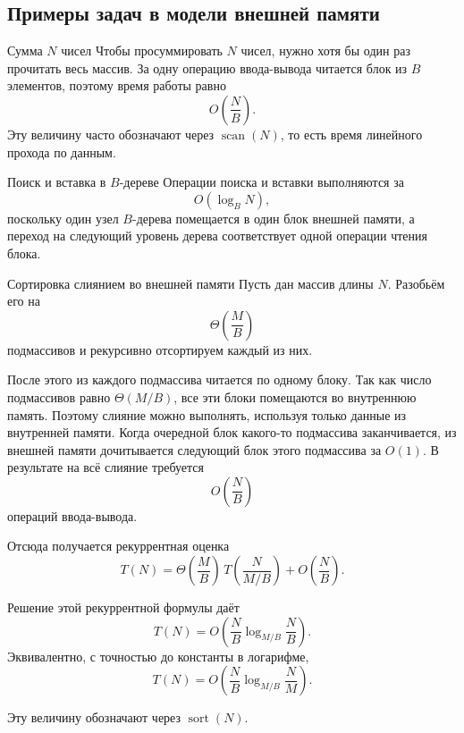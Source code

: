 \subsection{Примеры задач в модели внешней памяти}

\begin{Example}{Сумма \(N\) чисел}{}
	Чтобы просуммировать \(N\) чисел, нужно хотя бы один раз прочитать весь массив. За одну операцию ввода-вывода читается блок из \(B\) элементов, поэтому время работы равно
	\[
	O\!\left(\frac{N}{B}\right).
	\]
	Эту величину часто обозначают через \(\operatorname{scan}(N)\), то есть время линейного прохода по данным.
\end{Example}

\begin{Example}{Поиск и вставка в \(B\)-дереве}{}
	Операции поиска и вставки выполняются за
	\[
	O(\log_B N),
	\]
	поскольку один узел \(B\)-дерева помещается в один блок внешней памяти, а переход на следующий уровень дерева соответствует одной операции чтения блока.
\end{Example}

\begin{Example}{Сортировка слиянием во внешней памяти}{}
	Пусть дан массив длины \(N\). Разобьём его на
	\[
	\Theta\!\left(\frac{M}{B}\right)
	\]
	подмассивов и рекурсивно отсортируем каждый из них.
	
	После этого из каждого подмассива читается по одному блоку. Так как число подмассивов равно \(\Theta(M/B)\), все эти блоки помещаются во внутреннюю память. Поэтому слияние можно выполнять, используя только данные из внутренней памяти. Когда очередной блок какого-то подмассива заканчивается, из внешней памяти дочитывается следующий блок этого подмассива за 
	\(O(1)\). В результате на всё слияние требуется
	\[
	O\!\left(\frac{N}{B}\right)
	\]
	операций ввода-вывода.
	
	Отсюда получается рекуррентная оценка
	\[
	T(N)=\Theta\!\left(\frac{M}{B}\right)\,T\!\left(\frac{N}{M/B}\right)+O\!\left(\frac{N}{B}\right).
	\]
	
	Решение этой рекуррентной формулы даёт
	\[
	T(N)=O\!\left(\frac{N}{B}\log_{M/B}\frac{N}{B}\right).
	\]
	Эквивалентно, с точностью до константы в логарифме,
	\[
	T(N)=O\!\left(\frac{N}{B}\log_{M/B}\frac{N}{M}\right).
	\]
	
	Эту величину обозначают через \(\operatorname{sort}(N).\)
\end{Example}